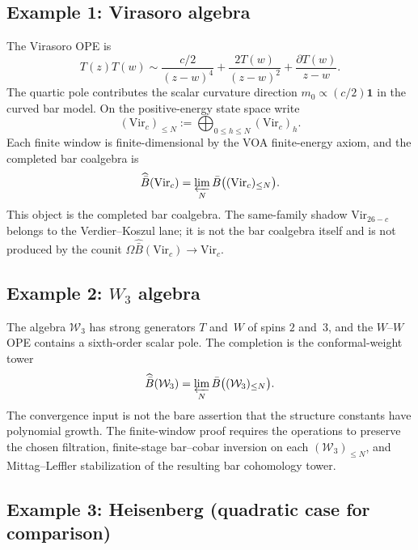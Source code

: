 \subsection{Example 1: Virasoro algebra}

\begin{example}\label{ex:virasoro-completion}
The Virasoro OPE is
\[
T(z)T(w)\sim
\frac{c/2}{(z-w)^4}
+\frac{2T(w)}{(z-w)^2}
+\frac{\partial T(w)}{z-w}.
\]
The quartic pole contributes the scalar curvature direction
$m_0\propto(c/2)\mathbf 1$ in the curved bar model.  On the
positive-energy state space write
\[
(\mathrm{Vir}_c)_{\le N}:=\bigoplus_{0\le h\le N}
(\mathrm{Vir}_c)_h .
\]
Each finite window is finite-dimensional by the VOA finite-energy
axiom, and the completed bar coalgebra is
\[
\widehat{\bar B}(\mathrm{Vir}_c)
=
\varprojlim_N
\bar B\bigl((\mathrm{Vir}_c)_{\le N}\bigr).
\]
This object is the completed bar coalgebra.  The same-family shadow
$\mathrm{Vir}_{26-c}$ belongs to the Verdier--Koszul lane; it is not
the bar coalgebra itself and is not produced by the counit
$\Omega\widehat{\bar B}(\mathrm{Vir}_c)\to\mathrm{Vir}_c$.
\end{example}

\subsection{\texorpdfstring{Example 2: $W_3$ algebra}{Example 2: W-3 algebra}}

\begin{example}\label{ex:w3-completion}
The algebra $\mathcal W_3$ has strong generators $T$ and~$W$ of spins
$2$ and~$3$, and the $W$--$W$ OPE contains a sixth-order scalar pole.
The completion is the conformal-weight tower
\[
\widehat{\bar B}(\mathcal W_3)
=
\varprojlim_N
\bar B\bigl((\mathcal W_3)_{\le N}\bigr).
\]
The convergence input is not the bare assertion that the structure
constants have polynomial growth.  The finite-window proof requires
the operations to preserve the chosen filtration, finite-stage
bar--cobar inversion on each $(\mathcal W_3)_{\le N}$, and
Mittag--Leffler stabilization of the resulting bar cohomology tower.
\end{example}

\subsection{Example 3: Heisenberg (quadratic case for comparison)}


